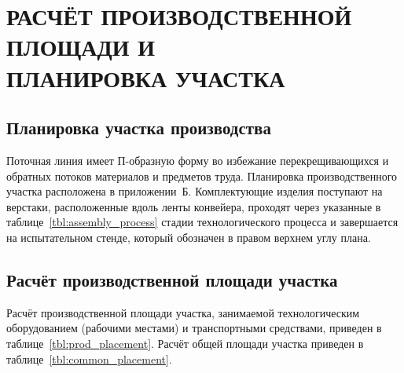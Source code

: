 \section[Расчёт производственной площади и планировка участка]
{РАСЧЁТ ПРОИЗВОДСТВЕННОЙ ПЛОЩАДИ И \\
ПЛАНИРОВКА УЧАСТКА}
\label{sec:placement}

\subsection{Планировка участка производства}

Поточная линия имеет П-образную форму во избежание перекрещивающихся и
обратных потоков материалов и предметов труда.
Планировка производственного участка расположена в приложении~Б.
Комплектующие изделия поступают на верстаки,
расположенные вдоль ленты конвейера,
проходят через указанные в таблице~\ref{tbl:assembly_process} стадии
технологического процесса и завершается на испытательном стенде,
который обозначен в правом верхнем углу плана.

\subsection{Расчёт производственной площади участка}

Расчёт производственной площади участка, занимаемой технологическим оборудованием
(рабочими местами) и транспортными средствами,
приведен в таблице~\ref{tbl:prod_placement}.
Расчёт общей площади участка приведен в таблице~\ref{tbl:common_placement}.

